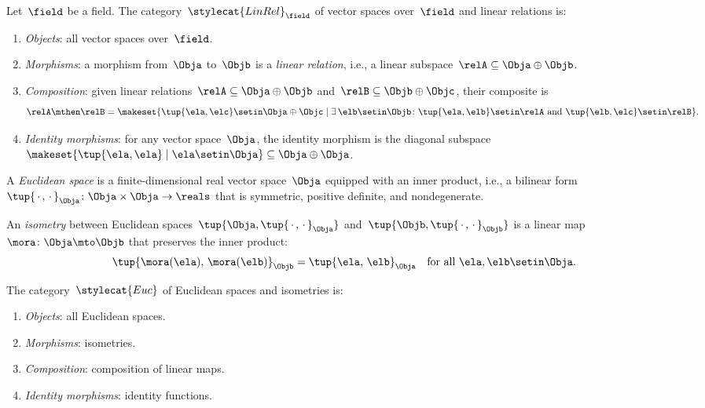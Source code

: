 \begin{ctdefinition}
    \label{def:cat-of-linear-relations}
    Let~$\field$ be a field.
    The category~$\stylecat{LinRel}_\field$ of vector spaces over~$\field$ and linear relations is:
    \begin{enumerate}
        \item \emph{Objects}: all vector spaces over~$\field$.
        \item \emph{Morphisms}: a morphism from~$\Obja$ to~$\Objb$ is a \emph{linear relation}, i.e., a linear subspace~$\relA \subseteq \Obja \oplus \Objb$.
        \item \emph{Composition}: given linear relations~$\relA \subseteq \Obja \oplus \Objb$ and~$\relB \subseteq \Objb \oplus \Objc$, their composite is
              \begin{equation}
                  \relA \mthen \relB = \makeset{ \tup{\ela, \elc} \setin \Obja \oplus \Objc \mid \exists\, \elb \setin \Objb \colon \tup{\ela, \elb} \setin \relA \text{ and } \tup{\elb, \elc} \setin \relB }.
              \end{equation}
        \item \emph{Identity morphisms}: for any vector space~$\Obja$, the identity morphism is the diagonal subspace~$\makeset{ \tup{\ela, \ela} \mid \ela \setin \Obja } \subseteq \Obja \oplus \Obja$.
    \end{enumerate}
\end{ctdefinition}

\begin{ctdefinition}
    \label{def:cat-of-euclidean-isometries}
    A \emph{Euclidean space} is a finite-dimensional real vector space~$\Obja$ equipped with an inner product, i.e., a bilinear form~$\tup{\,\cdot\,,\,\cdot\,}_\Obja \colon \Obja \times \Obja \to \reals$ that is symmetric, positive definite, and nondegenerate.

    An \emph{isometry} between Euclidean spaces~$\tup{\Obja, \tup{\,\cdot\,,\,\cdot\,}_\Obja}$ and~$\tup{\Objb, \tup{\,\cdot\,,\,\cdot\,}_\Objb}$ is a linear map~$\mora \colon \Obja \mto \Objb$ that preserves the inner product:
    \begin{equation}
        \tup{\mora(\ela),\, \mora(\elb)}_\Objb = \tup{\ela,\, \elb}_\Obja \quad \text{for all } \ela, \elb \setin \Obja.
    \end{equation}

    The category~$\stylecat{Euc}$ of Euclidean spaces and isometries is:
    \begin{enumerate}
        \item \emph{Objects}: all Euclidean spaces.
        \item \emph{Morphisms}: isometries.
        \item \emph{Composition}: composition of linear maps.
        \item \emph{Identity morphisms}: identity functions.
    \end{enumerate}
\end{ctdefinition}


